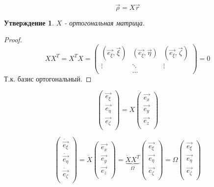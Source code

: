 \documentclass{article}
\newtheorem{ass}{Утверждение}
\begin{document}
  $$ \vec{\rho} = X \vec{r} $$
  
  \begin{ass}
  $X$ - ортогональная матрица.
  \end{ass}
  \begin{proof}
  $$ XX^T = X^TX = 
  \left(
  \begin{matrix}
  (\vec{e_{\xi}}, \vec{\xi}) & 
  (\vec{e_{\xi}}, \vec{\eta}) & 
  (\vec{e_{\xi}}, \vec{\zeta}) \\
  \vdots & \ddots & \vdots \\
   & \ldots &
  \end{matrix} 
  \right)
  = 0 $$
  Т.к. базис ортогональный.
  \end{proof} 
  
  $$
  \left(
  \begin{matrix}
  \vec{e_{\xi}} \\
  \vec{e_{\eta}} \\
  \vec{e_{\zeta}} \\
  \end{matrix}
  \right)  
  =  
  X
  \left(
  \begin{matrix}
  \vec{e_{x}} \\
  \vec{e_{y}} \\
  \vec{e_{z}} \\
  \end{matrix}
  \right)
  $$

  $$
  \left(
  \begin{matrix}
  \dot{\vec{e_{\xi}}} \\
  \dot{\vec{e_{\eta}}} \\
  \dot{\vec{e_{\zeta}}} \\  
  \end{matrix}
  \right)
  = 
  \dot{X}
  \left(
  \begin{matrix}
  \vec{e_{x}} \\
  \vec{e_{y}} \\
  \vec{e_{z}} \\
  \end{matrix}
  \right) =
  \underbrace{
  \dot{X} X^T
  }_{\Omega}
  \left(
  \begin{matrix}
  \vec{e_{\xi}} \\
  \vec{e_{\eta}} \\
  \vec{e_{\zeta}} \\
  \end{matrix}
  \right)
  =
  \Omega
  \left(
  \begin{matrix}
  \vec{e_{\xi}} \\
  \vec{e_{\eta}} \\
  \vec{e_{\zeta}} \\
  \end{matrix}
  \right) 
  $$
\end{document}
